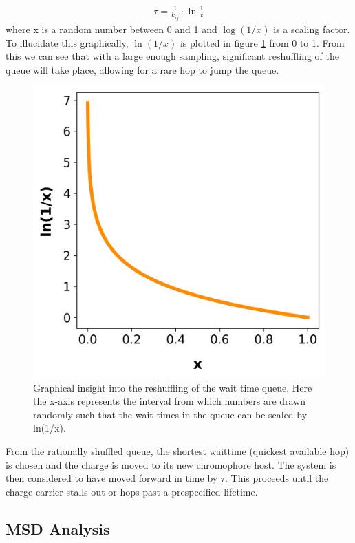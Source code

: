 \begin{align}
    \tau = \frac{1}{k_{ij}} \cdot \ln{\frac{1}{x}} 
\end{align}
where x is a random number between 0 and 1 and $\log{(1/x)}$ is a scaling factor. To illucidate this
graphically, $\ln{(1/x)}$ is plotted in figure \ref{fig:ln} from 0 to 1. From this we can see that with
a large enough sampling, significant reshuffling of the queue will take place, allowing for a rare hop to jump
the queue.

\begin{figure}
  \center
  \includegraphics[width=0.8\linewidth]{figures/naturallog.png}
  \caption{Graphical insight into the reshuffling of the wait time queue. Here the x-axis represents the 
    interval from which numbers are drawn randomly such that the wait times in the queue can be scaled 
    by ln(1/x).}
  \label{fig:ln}
\end{figure}

From the rationally shuffled queue, the shortest waittime (quickest available hop) is chosen and the charge is moved to
its new chromophore host. The system is then considered to have moved forward in time by $\tau$. This proceeds
until the charge carrier stalls out or hops past a prespecified lifetime. 

\subsection{MSD Analysis}


